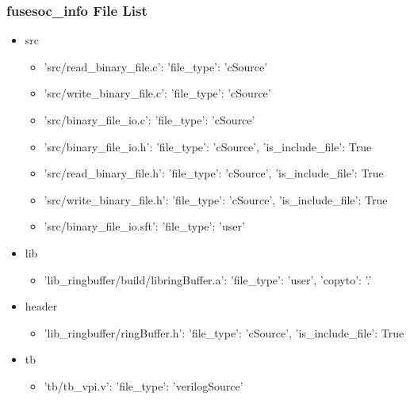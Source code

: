 \subsubsection{fusesoc\_info File List}
\begin{itemize}
\item src
	\begin{itemize}
	\item {'src/read\_binary\_file.c': {'file\_type': 'cSource'}}
	\item {'src/write\_binary\_file.c': {'file\_type': 'cSource'}}
	\item {'src/binary\_file\_io.c': {'file\_type': 'cSource'}}
	\item {'src/binary\_file\_io.h': {'file\_type': 'cSource', 'is\_include\_file': True}}
	\item {'src/read\_binary\_file.h': {'file\_type': 'cSource', 'is\_include\_file': True}}
	\item {'src/write\_binary\_file.h': {'file\_type': 'cSource', 'is\_include\_file': True}}
	\item {'src/binary\_file\_io.sft': {'file\_type': 'user'}}
	\end{itemize}
\item lib
	\begin{itemize}
	\item {'lib\_ringbuffer/build/libringBuffer.a': {'file\_type': 'user', 'copyto': '.'}}
	\end{itemize}
\item header
	\begin{itemize}
	\item {'lib\_ringbuffer/ringBuffer.h': {'file\_type': 'cSource', 'is\_include\_file': True}}
	\end{itemize}
\item tb
	\begin{itemize}
	\item {'tb/tb\_vpi.v': {'file\_type': 'verilogSource'}}
	\end{itemize}
\end{itemize}

